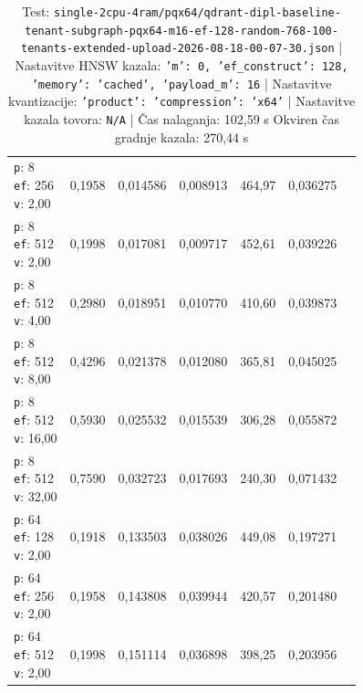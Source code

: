 \begin{table}[htbp]
\begin{tabularx}{\textwidth}{Xrrrrrr}
    \makecell{\texttt{p}: 8\\\texttt{ef}: 256\\\texttt{v}: 2,00} & 0,1958 & 0,014586 & 0,008913 & 464,97 & 0,036275 \\
    \makecell{\texttt{p}: 8\\\texttt{ef}: 512\\\texttt{v}: 2,00} & 0,1998 & 0,017081 & 0,009717 & 452,61 & 0,039226 \\
    \makecell{\texttt{p}: 8\\\texttt{ef}: 512\\\texttt{v}: 4,00} & 0,2980 & 0,018951 & 0,010770 & 410,60 & 0,039873 \\
    \makecell{\texttt{p}: 8\\\texttt{ef}: 512\\\texttt{v}: 8,00} & 0,4296 & 0,021378 & 0,012080 & 365,81 & 0,045025 \\
    \makecell{\texttt{p}: 8\\\texttt{ef}: 512\\\texttt{v}: 16,00} & 0,5930 & 0,025532 & 0,015539 & 306,28 & 0,055872 \\
    \makecell{\texttt{p}: 8\\\texttt{ef}: 512\\\texttt{v}: 32,00} & 0,7590 & 0,032723 & 0,017693 & 240,30 & 0,071432 \\
    \makecell{\texttt{p}: 64\\\texttt{ef}: 128\\\texttt{v}: 2,00} & 0,1918 & 0,133503 & 0,038026 & 449,08 & 0,197271 \\
    \makecell{\texttt{p}: 64\\\texttt{ef}: 256\\\texttt{v}: 2,00} & 0,1958 & 0,143808 & 0,039944 & 420,57 & 0,201480 \\
    \makecell{\texttt{p}: 64\\\texttt{ef}: 512\\\texttt{v}: 2,00} & 0,1998 & 0,151114 & 0,036898 & 398,25 & 0,203956 \\
    \bottomrule
  \end{tabularx}
\caption* {Test: \texttt{single-2cpu-4ram/pqx64/qdrant-dipl-baseline-tenant-subgraph-pqx64-m16-ef-128-random-768-100-tenants-extended-upload-2026-08-18-00-07-30.json} | Nastavitve HNSW kazala: \texttt{{'m': 0, 'ef\_construct': 128, 'memory': 'cached', 'payload\_m': 16}} | Nastavitve kvantizacije: \texttt{{'product': {'compression': 'x64'}}} | Nastavitve kazala tovora: \texttt{N/A} | Čas nalaganja: 102,59 s Okviren čas gradnje kazala: 270,44 s}\end{table}


